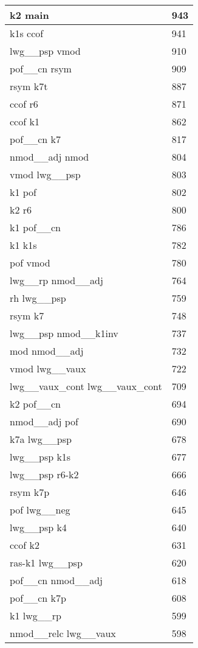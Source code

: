 \documentclass[a4 paper]{article}
\begin{document}
\begin{longtable}{p{}p{}}
k2 main  & 943 \\ \midrule
k1s ccof  & 941 \\ \midrule
lwg\_\_psp vmod  & 910 \\ \midrule
pof\_\_cn rsym  & 909 \\ \midrule
rsym k7t  & 887 \\ \midrule
ccof r6  & 871 \\ \midrule
ccof k1  & 862 \\ \midrule
pof\_\_cn k7  & 817 \\ \midrule
nmod\_\_adj nmod  & 804 \\ \midrule
vmod lwg\_\_psp  & 803 \\ \midrule
k1 pof  & 802 \\ \midrule
k2 r6  & 800 \\ \midrule
k1 pof\_\_cn  & 786 \\ \midrule
k1 k1s  & 782 \\ \midrule
pof vmod  & 780 \\ \midrule
lwg\_\_rp nmod\_\_adj  & 764 \\ \midrule
rh lwg\_\_psp  & 759 \\ \midrule
rsym k7  & 748 \\ \midrule
lwg\_\_psp nmod\_\_k1inv  & 737 \\ \midrule
mod nmod\_\_adj  & 732 \\ \midrule
vmod lwg\_\_vaux  & 722 \\ \midrule
lwg\_\_vaux\_cont lwg\_\_vaux\_cont  & 709 \\ \midrule
k2 pof\_\_cn  & 694 \\ \midrule
nmod\_\_adj pof  & 690 \\ \midrule
k7a lwg\_\_psp  & 678 \\ \midrule
lwg\_\_psp k1s  & 677 \\ \midrule
lwg\_\_psp r6-k2  & 666 \\ \midrule
rsym k7p  & 646 \\ \midrule
pof lwg\_\_neg  & 645 \\ \midrule
lwg\_\_psp k4  & 640 \\ \midrule
ccof k2  & 631 \\ \midrule
ras-k1 lwg\_\_psp  & 620 \\ \midrule
pof\_\_cn nmod\_\_adj  & 618 \\ \midrule
pof\_\_cn k7p  & 608 \\ \midrule
k1 lwg\_\_rp  & 599 \\ \midrule
nmod\_\_relc lwg\_\_vaux  & 598 \\ \midrule

\end{longtable}
\end{document}
